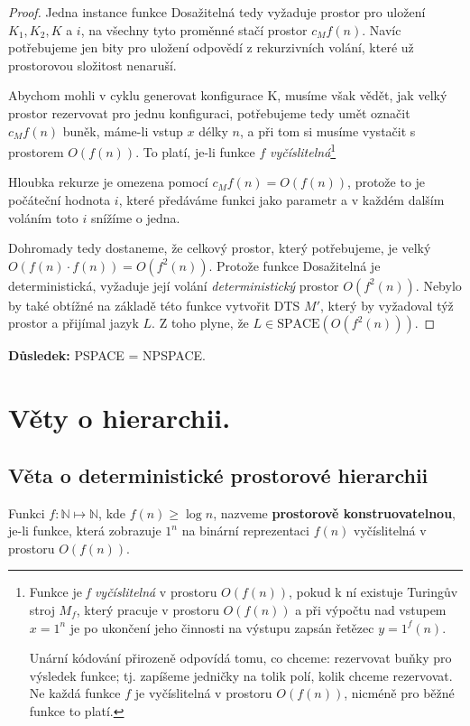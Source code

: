 \documentclass[11pt]{report} %
\newcommand{\N}{\mathbb{N}}
\numberwithin{equation}{section}
\begin{document}
\begin{proof}
Jedna instance funkce Dosažitelná tedy vyžaduje prostor pro uložení $K_1, K_2, K$ a $i$, na všechny tyto proměnné stačí prostor $c_Mf(n)$. Navíc potřebujeme jen bity pro uložení odpovědí z rekurzivních volání, které už prostorovou složitost nenaruší. 

Abychom mohli v cyklu generovat konfigurace K, musíme však vědět, jak velký prostor rezervovat pro jednu konfiguraci,
potřebujeme tedy umět označit $c_Mf(n)$ buněk, máme-li vstup $x$ délky $n$, a při tom si musíme vystačit s prostorem $O(f(n))$. To platí, je-li funkce $f$ \textit{vyčíslitelná}\footnote{Funkce je \textit{f vyčíslitelná} v prostoru $O(f(n))$, pokud k ní existuje Turingův stroj $M_f$, který pracuje v prostoru $O(f(n))$ a při výpočtu nad vstupem $x = 1^n$ je po ukončení jeho činnosti na výstupu zapsán řetězec $y = 1^f(n)$. 

Unární kódování přirozeně odpovídá tomu, co chceme: rezervovat buňky pro výsledek funkce; tj. zapíšeme jedničky na tolik polí, kolik chceme rezervovat. Ne každá funkce $f$ je vyčíslitelná v prostoru $O(f(n))$, nicméně pro běžné funkce to platí.}

Hloubka rekurze je omezena pomocí $c_Mf(n) = O(f(n))$, protože to je počáteční hodnota $i$, které předáváme funkci jako parametr a v každém dalším voláním toto $i$ snížíme o jedna. 

Dohromady tedy dostaneme, že celkový prostor, který potřebujeme, je velký $O(f(n) \cdot f(n)) = O(f^2(n))$. Protože funkce Dosažitelná je deterministická, vyžaduje její volání \textit{deterministický} prostor $O(f^2(n))$. Nebylo by také obtížné na základě této funkce vytvořit DTS $M'$, který by vyžadoval týž prostor a přijímal jazyk $L$. Z toho plyne, že
$L \in \text{SPACE}(O(f^2(n)))$.
\end{proof}

\noindent\textbf{Důsledek:} PSPACE = NPSPACE.

\section{Věty o hierarchii.}

\subsection{Věta o deterministické prostorové hierarchii}
Funkci $f : \N \mapsto \N$, kde $f(n) \geq \log n$, nazveme \textbf{prostorově konstruovatelnou}, je-li funkce, která zobrazuje $1^n$ na binární reprezentaci $f(n)$ vyčíslitelná v prostoru $O(f(n))$.
\end{document}
